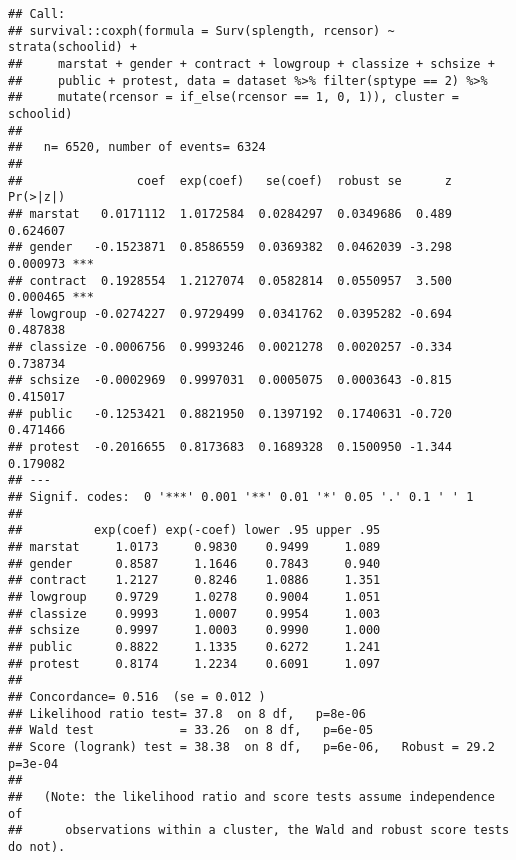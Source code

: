 \documentclass[
]{article}
\begin{document}
\begin{verbatim}
## Call:
## survival::coxph(formula = Surv(splength, rcensor) ~ strata(schoolid) + 
##     marstat + gender + contract + lowgroup + classize + schsize + 
##     public + protest, data = dataset %>% filter(sptype == 2) %>% 
##     mutate(rcensor = if_else(rcensor == 1, 0, 1)), cluster = schoolid)
## 
##   n= 6520, number of events= 6324 
## 
##                coef  exp(coef)   se(coef)  robust se      z Pr(>|z|)    
## marstat   0.0171112  1.0172584  0.0284297  0.0349686  0.489 0.624607    
## gender   -0.1523871  0.8586559  0.0369382  0.0462039 -3.298 0.000973 ***
## contract  0.1928554  1.2127074  0.0582814  0.0550957  3.500 0.000465 ***
## lowgroup -0.0274227  0.9729499  0.0341762  0.0395282 -0.694 0.487838    
## classize -0.0006756  0.9993246  0.0021278  0.0020257 -0.334 0.738734    
## schsize  -0.0002969  0.9997031  0.0005075  0.0003643 -0.815 0.415017    
## public   -0.1253421  0.8821950  0.1397192  0.1740631 -0.720 0.471466    
## protest  -0.2016655  0.8173683  0.1689328  0.1500950 -1.344 0.179082    
## ---
## Signif. codes:  0 '***' 0.001 '**' 0.01 '*' 0.05 '.' 0.1 ' ' 1
## 
##          exp(coef) exp(-coef) lower .95 upper .95
## marstat     1.0173     0.9830    0.9499     1.089
## gender      0.8587     1.1646    0.7843     0.940
## contract    1.2127     0.8246    1.0886     1.351
## lowgroup    0.9729     1.0278    0.9004     1.051
## classize    0.9993     1.0007    0.9954     1.003
## schsize     0.9997     1.0003    0.9990     1.000
## public      0.8822     1.1335    0.6272     1.241
## protest     0.8174     1.2234    0.6091     1.097
## 
## Concordance= 0.516  (se = 0.012 )
## Likelihood ratio test= 37.8  on 8 df,   p=8e-06
## Wald test            = 33.26  on 8 df,   p=6e-05
## Score (logrank) test = 38.38  on 8 df,   p=6e-06,   Robust = 29.2  p=3e-04
## 
##   (Note: the likelihood ratio and score tests assume independence of
##      observations within a cluster, the Wald and robust score tests do not).
\end{verbatim}
\end{document}

